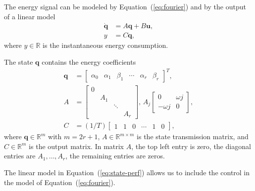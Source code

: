 \documentclass[letterpaper,10pt,conference]{ieeeconf}
\theoremstyle{definition}
\begin{document}
The energy signal can be modeled by Equation~(\ref{eq:fourier}) and by the output of a linear model
\begin{equation}\label{eq:state-perf}\begin{split}
  \dot{\mathbf{q}}&=A\mathbf{q}+B\mathbf{u},\\
  y&=C\mathbf{q},
\end{split}\end{equation}
where $y\in\mathbb{R}$ is the instantaneous energy consumption. 

The state $\mathbf{q}$ contains the energy coefficients
\begin{equation}\label{eq:state-details}\begin{split}
  \mathbf{q}&=\left[\begin{array}{cccccc}
    \alpha_0 & \alpha_1 & \beta_1 & \cdots & \alpha_r & \beta_r
  \end{array}\right]^T,\\
  A&=\left[\begin{array}{cccc}
    0&    &       &  \\
     & A_1&       &  \\
     &    & \ddots&  \\
     &    &       & A_r 
  \end{array}\right],\,A_j\begin{bmatrix}0 & \omega j \\ -\omega j & 0\end{bmatrix},\\
  C&=(1/T)\left[\begin{array}{cccccc}
    1 & 1 & 0 &\cdots & 1 & 0
  \end{array}\right],
\end{split}\end{equation}
where $\mathbf{q}\in\mathbb{R}^m$ with $m=2r+1$, $A\in\mathbb{R}^{m\times m}$ is the state transmission matrix, and $C\in\mathbb{R}^m$ is the output matrix. In matrix $A$, the top left entry is zero, the diagonal entries are $A_1,\dots,A_r$, the remaining entries are zeros.

The linear model in Equation~(\ref{eq:state-perf}) allows us to include the control in the model of Equation~(\ref{eq:fourier}).
\end{document}
